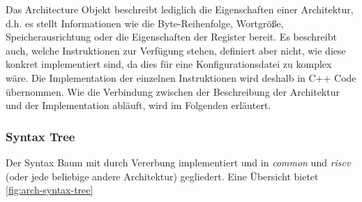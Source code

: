 Das Architecture Objekt beschreibt lediglich die Eigenschaften einer
Architektur, d.h. es stellt Informationen wie die Byte-Reihenfolge, Wortgröße,
Speicherausrichtung oder die Eigenschaften der Register bereit. Es beschreibt
auch, welche Instruktionen zur Verfügung stehen, definiert aber nicht, wie diese
konkret implementiert sind, da dies für eine Konfigurationsdatei zu komplex
wäre. Die Implementation der einzelnen Instruktionen wird deshalb in C++ Code
übernommen. Wie die Verbindung zwischen der Beschreibung der Architektur und der
Implementation abläuft, wird im Folgenden erläutert.

\subsubsection{Syntax Tree}

Der Syntax Baum mit durch Vererbung implementiert und in \textit{common} und
\textit{riscv} (oder jede beliebige andere Architektur) gegliedert. Eine
Übersicht bietet \autoref{fig:arch-syntax-tree}

